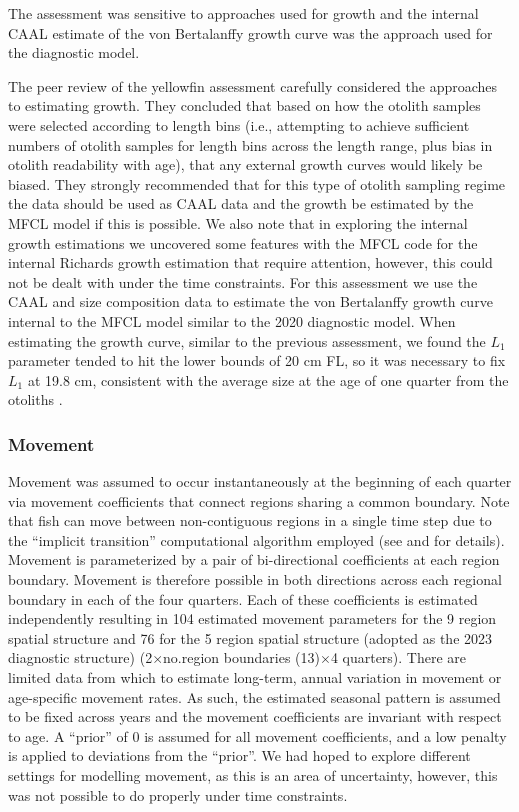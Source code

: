 The assessment was sensitive to approaches used for growth and the internal CAAL estimate of the von Bertalanffy growth curve was the approach used for the diagnostic model.

The peer review of the yellowfin assessment \citep{punt_independent_2023} carefully considered the approaches to estimating growth. They concluded that based on how the otolith samples were selected according to length bins (i.e., attempting to achieve sufficient numbers of otolith samples for length bins across the length range, plus bias in otolith readability with age), that any external growth curves would likely be biased. They strongly recommended that for this type of otolith sampling regime the data should be used as CAAL data and the growth be estimated by the MFCL model if this is possible. We also note that in exploring the internal growth estimations we uncovered some features with the MFCL code for the internal Richards growth estimation that require attention, however, this could not be dealt with under the time constraints. For this assessment we use the CAAL and size composition data to estimate the von Bertalanffy growth curve internal to the MFCL model similar to the 2020 diagnostic model. When estimating the growth curve, similar to the previous assessment, we found the $L_1$ parameter tended to hit the lower bounds of 20 cm FL, so it was necessary to fix $L_1$ at 19.8 cm, consistent with the average size at the age of one quarter from the otoliths \citep{farley_age_2020}.

\subsubsection{Movement}
\label{sec:model_movement}

Movement was assumed to occur instantaneously at the beginning of each quarter via movement coefficients that connect regions sharing a common boundary. Note that fish can move between non-contiguous regions in a single time step due to the \enquote{implicit transition} computational algorithm employed (see \citealp{hampton_spatially-disaggregated_2001} and \citealp{kleiber_multifan-cl_2019} for details). Movement is parameterized by a pair of bi-directional coefficients at each region boundary. Movement is therefore possible in both directions across each regional boundary in each of the four quarters. Each of these coefficients is estimated independently resulting in 104 estimated movement parameters for the 9 region spatial structure and 76 for the 5 region spatial structure (adopted as the 2023 diagnostic structure) (2$\times$no.region boundaries (13)$\times$4 quarters). There are limited data from which to estimate long-term, annual variation in movement or age-specific movement rates. As such, the estimated seasonal pattern is assumed to be fixed across years and the movement coefficients are invariant with respect to age. A \enquote{prior} of 0 is assumed for all movement coefficients, and a low penalty is applied to deviations from the \enquote{prior}. We had hoped to explore different settings for modelling movement, as this is an area of uncertainty, however, this was not possible to do properly under time constraints.

